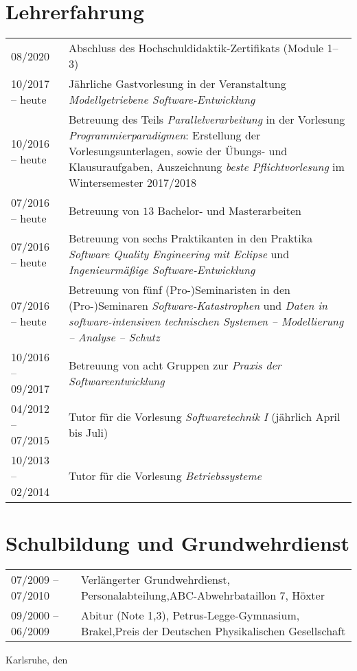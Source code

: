 \section*{Lehrerfahrung}
\begin{tabular}{@{}p{3.1cm} p{11cm}}
08/2020 &
Abschluss des Hochschuldidaktik-Zertifikats (Module 1--3)\\
10/2017 -- heute &
Jährliche Gastvorlesung in der Veranstaltung \emph{Modellgetriebene Software-Entwicklung}\\
10/2016 -- heute & 
Betreuung des Teils \emph{Parallelverarbeitung} in der Vorlesung \emph{Programmierparadigmen}: Erstellung der Vorlesungsunterlagen, sowie der Übungs- und Klausuraufgaben,\newline
Auszeichnung \emph{beste Pflichtvorlesung} im Wintersemester 2017/2018\\
07/2016 -- heute &
Betreuung von $13$ Bachelor- und Masterarbeiten\\
07/2016 -- heute & Betreuung von sechs Praktikanten in den Praktika \emph{Software Quality Engineering mit Eclipse} und \emph{Ingenieurmäßige Software-Entwicklung} \\
07/2016 -- heute& Betreuung von fünf (Pro-)Seminaristen in den (Pro-)Seminaren \emph{Software-Katastrophen} und \emph{Daten in software-intensiven technischen Systemen -- Modellierung -- Analyse -- Schutz}\\
10/2016 -- 09/2017 &
Betreuung von acht Gruppen zur \emph{Praxis der Softwareentwicklung}\\
04/2012 -- 07/2015 & Tutor für die Vorlesung \emph{Softwaretechnik I} (jährlich April bis Juli)\\
10/2013 -- 02/2014 & Tutor für die Vorlesung \emph{Betriebssysteme}
\end{tabular}

\section*{Schulbildung und Grundwehrdienst}
\begin{tabular}{@{}p{3.1cm} p{11cm}}
07/2009 -- 07/2010 & Verlängerter Grundwehrdienst, Personalabteilung,\newline ABC-Abwehrbataillon 7, Höxter\\
09/2000 -- 06/2009 & Abitur (Note 1,3), \newline Petrus-Legge-Gymnasium, Brakel,\newline Preis der Deutschen Physikalischen Gesellschaft
\end{tabular}

\vspace{2\baselineskip}
\noindent Karlsruhe, den \disssubmissiondate

\vspace{2\baselineskip}
\noindent \dissauthor
